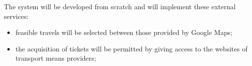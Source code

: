 The system will be developed from scratch and will implement these external services:
\begin{itemize}
\item feasible travels will be selected between those provided by Google Maps;
\item the acquisition of tickets will be permitted by giving access to the websites of transport means providers;
\end{itemize}